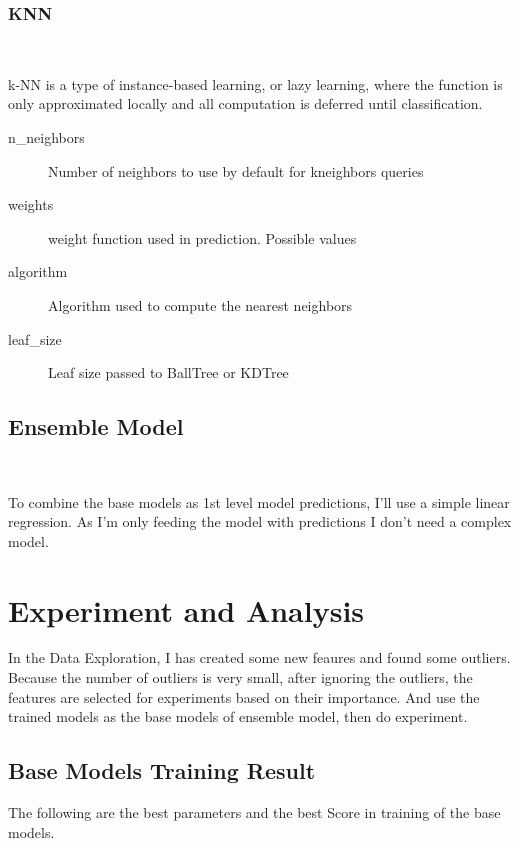 \subsubsection{KNN}
\

k-NN is a type of instance-based learning, 
or lazy learning, where the function is 
only approximated locally and all 
computation is deferred until classification. 


\begin{description}
	\item[n_neighbors] Number of neighbors to use by default for kneighbors 
	queries
	\item[weights] weight function used in prediction. Possible values
	\item[algorithm] Algorithm used to compute the nearest neighbors
	\item[leaf_size] Leaf size passed to BallTree or KDTree
\end{description}

\subsection{Ensemble Model}
\

To combine the base models as 1st level 
model predictions, I'll use a simple 
linear regression. As I'm only feeding 
the model with predictions 
I don't need a complex model.

\section{Experiment and Analysis}

In the Data Exploration, 
I has created some new feaures 
and found some outliers.
Because the number of outliers is very small, 
after ignoring the outliers, the features 
are selected for experiments based on their importance.
And use the trained models as 
the base models of ensemble model,
then do experiment.

\subsection{Base Models Training Result}

The following are the best parameters and 
the best Score in training of 
the base models. 

